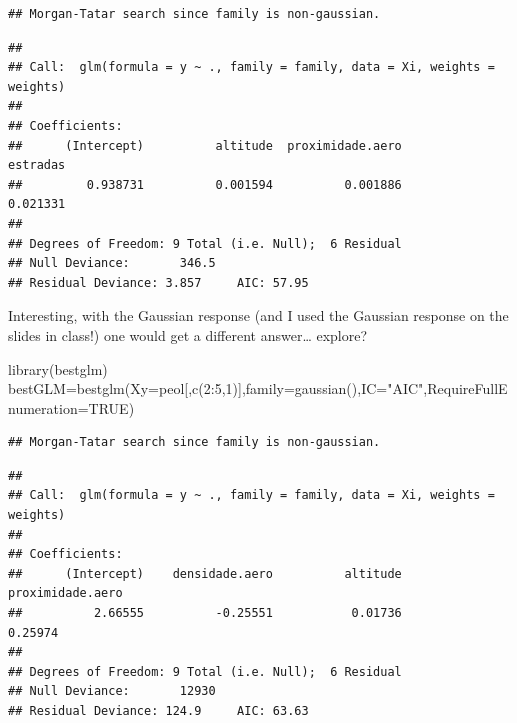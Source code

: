 \documentclass[
]{book}
\newenvironment{Shaded}{\begin{snugshade}}{\end{snugshade}}
\newcommand{\AttributeTok}[1]{\textcolor[rgb]{0.77,0.63,0.00}{#1}}
\newcommand{\ConstantTok}[1]{\textcolor[rgb]{0.00,0.00,0.00}{#1}}
\newcommand{\DecValTok}[1]{\textcolor[rgb]{0.00,0.00,0.81}{#1}}
\newcommand{\FunctionTok}[1]{\textcolor[rgb]{0.00,0.00,0.00}{#1}}
\newcommand{\NormalTok}[1]{#1}
\newcommand{\OtherTok}[1]{\textcolor[rgb]{0.56,0.35,0.01}{#1}}
\newcommand{\SpecialCharTok}[1]{\textcolor[rgb]{0.00,0.00,0.00}{#1}}
\newcommand{\StringTok}[1]{\textcolor[rgb]{0.31,0.60,0.02}{#1}}
\begin{document}
\begin{verbatim}
## Morgan-Tatar search since family is non-gaussian.
\end{verbatim}

\begin{Shaded}
\end{Shaded}

\begin{verbatim}
## 
## Call:  glm(formula = y ~ ., family = family, data = Xi, weights = weights)
## 
## Coefficients:
##      (Intercept)          altitude  proximidade.aero          estradas  
##         0.938731          0.001594          0.001886          0.021331  
## 
## Degrees of Freedom: 9 Total (i.e. Null);  6 Residual
## Null Deviance:       346.5 
## Residual Deviance: 3.857     AIC: 57.95
\end{verbatim}

Interesting, with the Gaussian response (and I used the Gaussian response on the slides in class!) one would get a different answer\ldots{} explore?

\begin{Shaded}
\begin{Highlighting}[]
\FunctionTok{library}\NormalTok{(bestglm)}
\NormalTok{bestGLM}\OtherTok{=}\FunctionTok{bestglm}\NormalTok{(}\AttributeTok{Xy=}\NormalTok{peol[,}\FunctionTok{c}\NormalTok{(}\DecValTok{2}\SpecialCharTok{:}\DecValTok{5}\NormalTok{,}\DecValTok{1}\NormalTok{)],}\AttributeTok{family=}\FunctionTok{gaussian}\NormalTok{(),}\AttributeTok{IC=}\StringTok{"AIC"}\NormalTok{,}\AttributeTok{RequireFullEnumeration=}\ConstantTok{TRUE}\NormalTok{)}
\end{Highlighting}
\end{Shaded}

\begin{verbatim}
## Morgan-Tatar search since family is non-gaussian.
\end{verbatim}

\begin{Shaded}
\end{Shaded}

\begin{verbatim}
## 
## Call:  glm(formula = y ~ ., family = family, data = Xi, weights = weights)
## 
## Coefficients:
##      (Intercept)    densidade.aero          altitude  proximidade.aero  
##          2.66555          -0.25551           0.01736           0.25974  
## 
## Degrees of Freedom: 9 Total (i.e. Null);  6 Residual
## Null Deviance:       12930 
## Residual Deviance: 124.9     AIC: 63.63
\end{verbatim}
\end{document}
